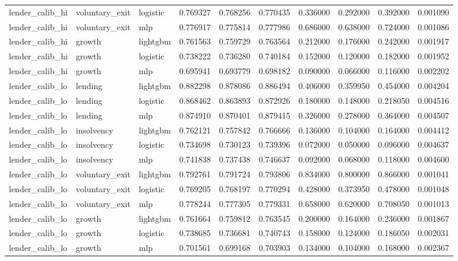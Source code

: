 \begin{table}
{\begin{tabular}{lllrrrrrrr}
lender_calib_hi & voluntary_exit & logistic & 0.769327 & 0.768256 & 0.770435 & 0.336000 & 0.292000 & 0.392000 & 0.001090 \\
lender_calib_hi & voluntary_exit & mlp & 0.776917 & 0.775814 & 0.777986 & 0.686000 & 0.638000 & 0.724000 & 0.001086 \\
lender_calib_hi & growth & lightgbm & 0.761563 & 0.759729 & 0.763564 & 0.212000 & 0.176000 & 0.242000 & 0.001917 \\
lender_calib_hi & growth & logistic & 0.738222 & 0.736280 & 0.740184 & 0.152000 & 0.120000 & 0.182000 & 0.001952 \\
lender_calib_hi & growth & mlp & 0.695941 & 0.693779 & 0.698182 & 0.090000 & 0.066000 & 0.116000 & 0.002202 \\
lender_calib_lo & lending & lightgbm & 0.882298 & 0.878086 & 0.886494 & 0.406000 & 0.359950 & 0.454000 & 0.004204 \\
lender_calib_lo & lending & logistic & 0.868462 & 0.863893 & 0.872926 & 0.180000 & 0.148000 & 0.218050 & 0.004516 \\
lender_calib_lo & lending & mlp & 0.874910 & 0.870401 & 0.879415 & 0.326000 & 0.278000 & 0.364000 & 0.004507 \\
lender_calib_lo & insolvency & lightgbm & 0.762121 & 0.757842 & 0.766666 & 0.136000 & 0.104000 & 0.164000 & 0.004412 \\
lender_calib_lo & insolvency & logistic & 0.734698 & 0.730123 & 0.739396 & 0.072000 & 0.050000 & 0.096000 & 0.004637 \\
lender_calib_lo & insolvency & mlp & 0.741838 & 0.737438 & 0.746637 & 0.092000 & 0.068000 & 0.118000 & 0.004600 \\
lender_calib_lo & voluntary_exit & lightgbm & 0.792761 & 0.791724 & 0.793806 & 0.834000 & 0.800000 & 0.866000 & 0.001041 \\
lender_calib_lo & voluntary_exit & logistic & 0.769205 & 0.768197 & 0.770294 & 0.428000 & 0.373950 & 0.478000 & 0.001048 \\
lender_calib_lo & voluntary_exit & mlp & 0.778244 & 0.777305 & 0.779331 & 0.658000 & 0.620000 & 0.708050 & 0.001013 \\
lender_calib_lo & growth & lightgbm & 0.761664 & 0.759812 & 0.763545 & 0.200000 & 0.164000 & 0.236000 & 0.001867 \\
lender_calib_lo & growth & logistic & 0.738685 & 0.736681 & 0.740743 & 0.158000 & 0.124000 & 0.186050 & 0.002031 \\
lender_calib_lo & growth & mlp & 0.701561 & 0.699168 & 0.703903 & 0.134000 & 0.104000 & 0.168000 & 0.002367 \\

\end{tabular}}
\end{table}
